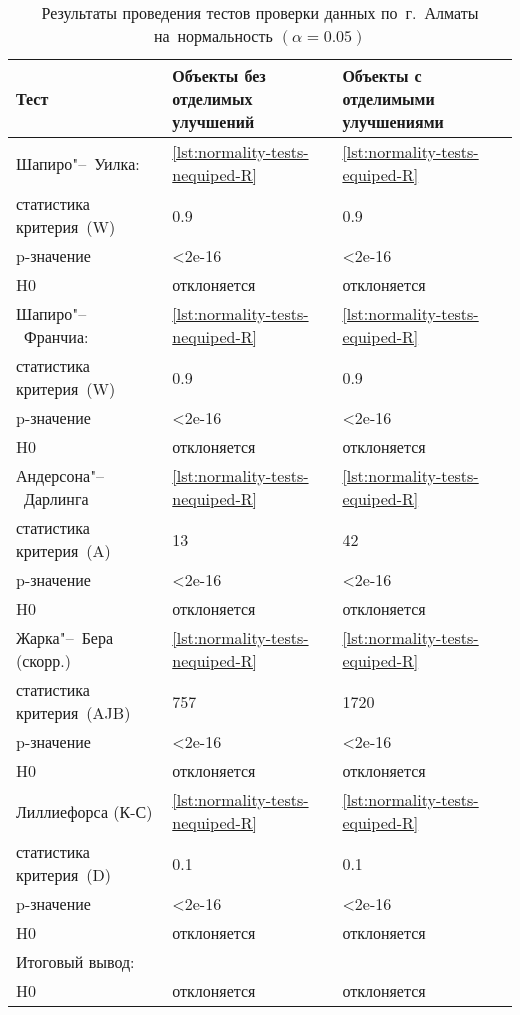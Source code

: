 \documentclass[]{scrartcl}
\begin{document}
\begin{table}[ht]
	\caption{Результаты проведения тестов проверки данных по~г.~Алматы на~нормальность $({\textstyle \alpha=0.05})$}\label{tab:normality-tests-values-R}
	\centering
	\begin{tabular}{lll}
		\hline
		Тест&Объекты без отделимых улучшений&Объекты с отделимыми улучшениями\\
		\hline
		Шапиро"--~Уилка:&\ref{lst:normality-tests-nequiped-R}&\ref{lst:normality-tests-equiped-R}\\
		статистика критерия~(W)&0.9&0.9\\
		p-значение&<2e-16&<2e-16\\
		H0&отклоняется&отклоняется\\
		\hline
		Шапиро"--~Франчиа:&\ref{lst:normality-tests-nequiped-R}&\ref{lst:normality-tests-equiped-R}\\
		статистика критерия~(W)&0.9&0.9\\
		p-значение&<2e-16&<2e-16\\
		H0&отклоняется&отклоняется\\
		\hline
		Андерсона"--~Дарлинга&\ref{lst:normality-tests-nequiped-R}&\ref{lst:normality-tests-equiped-R}\\
		статистика критерия~(A)&13&42\\
		p-значение&<2e-16&<2e-16\\
		H0&отклоняется&отклоняется\\
		\hline
		Жарка"--~Бера (скорр.)&\ref{lst:normality-tests-nequiped-R}&\ref{lst:normality-tests-equiped-R}\\
		статистика критерия~(AJB)&757&1720\\
		p-значение&<2e-16&<2e-16\\
		H0&отклоняется&отклоняется\\
		\hline
		Лиллиефорса (К-С)&\ref{lst:normality-tests-nequiped-R}&\ref{lst:normality-tests-equiped-R}\\
		статистика критерия~(D)&0.1&0.1\\
		p-значение&<2e-16&<2e-16\\
		H0&отклоняется&отклоняется\\
		\hline
		Итоговый вывод:&&\\
		H0&отклоняется&отклоняется\\
		\hline
	\end{tabular}
\end{table}
\end{document}
